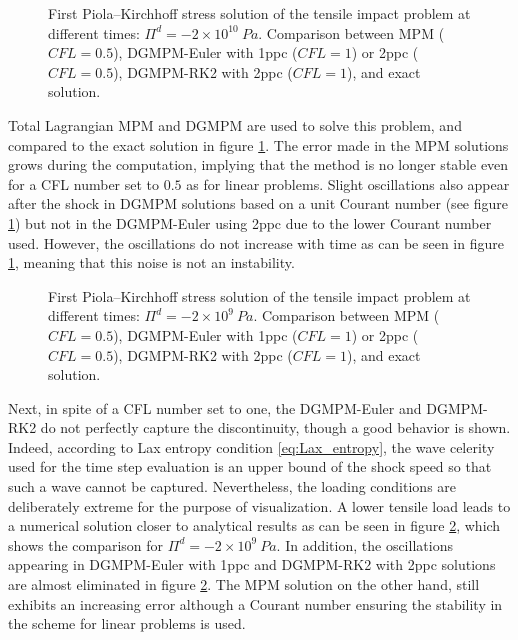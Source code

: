\begin{figure}[h!]
  \centering
  { \label{subfig:he_shock1}}
  { \label{subfig:he_shock2}}
  {}
  \caption{First Piola–Kirchhoff stress solution of the tensile impact problem at different times: $\Pi^d=-2\times 10^{10} \: Pa$. Comparison between MPM ($CFL=0.5$), DGMPM-Euler with 1ppc ($CFL=1$) or 2ppc ($CFL=0.5$), DGMPM-RK2 with 2ppc ($CFL=1$), and exact solution.}
  \label{fig:he_shock}
\end{figure}
Total Lagrangian MPM and DGMPM are used to solve this problem, and compared to the exact solution in figure \ref{fig:he_shock}.
The error made in the MPM solutions grows during the computation, implying that the method is no longer stable even for a CFL number set to $0.5$ as for linear problems.
Slight oscillations also appear after the shock in DGMPM solutions based on a unit Courant number (see figure \ref{fig:he_shock}) but not in the DGMPM-Euler using 2ppc due to the lower Courant number used.
However, the oscillations do not increase with time as can be seen in figure \ref{fig:he_shock}, meaning that this noise is not an instability.
\begin{figure}[h!]
  \centering
  { \label{subfig:he_low_shock1}}
  { \label{subfig:he_low_shock2}}
  {}
  \caption{First Piola–Kirchhoff stress solution of the tensile impact problem at different times: $\Pi^d=-2\times 10^{9} \: Pa$. Comparison between MPM ($CFL=0.5$), DGMPM-Euler with 1ppc ($CFL=1$) or 2ppc ($CFL=0.5$), DGMPM-RK2 with 2ppc ($CFL=1$), and exact solution.}
  \label{fig:he_low_shock}
\end{figure}
Next, in spite of a CFL number set to one, the DGMPM-Euler and DGMPM-RK2 do not perfectly capture the discontinuity, though a good behavior is shown. Indeed, according to Lax entropy condition \eqref{eq:Lax_entropy}, the wave celerity used for the time step evaluation is an upper bound of the shock speed so that such a wave cannot be captured.
Nevertheless, the loading conditions are deliberately extreme for the purpose of visualization. A lower tensile load leads to a numerical solution closer to analytical results as can be seen in figure \ref{fig:he_low_shock}, which shows the comparison for $\Pi^d=-2\times 10^{9} \: Pa$. In addition, the oscillations appearing in DGMPM-Euler with 1ppc and DGMPM-RK2 with 2ppc solutions are almost eliminated in figure \ref{fig:he_low_shock}. The MPM solution on the other hand, still exhibits an increasing error although a Courant number ensuring the stability in the scheme for linear problems is used.
